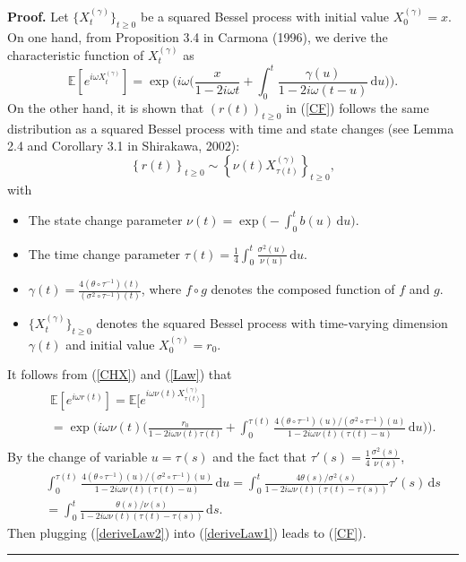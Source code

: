 \documentclass[6pt]{article}
\def\ud{\, \mathrm{d}}
\newenvironment{proof}[1][Proof]{\noindent\textbf{#1.} }{\ \rule{0.5em}{0.5em}}
\numberwithin{equation}{section}
\begin{document}
\begin{proof}
 Let $\{X^{(\gamma)}_t\}_{t\ge0}$ be a squared Bessel process with initial value $X^{(\gamma)}_0=x$. On one hand, from Proposition 3.4 in Carmona (1996), we derive the characteristic function of $X^{(\gamma)}_t$ as
\begin{equation}
\label{CHX}
\mathbb E[e^{i\omega X_t^{(\gamma)}}]=\exp\bigg(i\omega\Big(\frac{ x}{1-2i\omega t}+\int_0^t\frac{\gamma(u)}{1-2i\omega(t-u)}\ud u\Big)\bigg).
\end{equation}
On the other hand, it is shown that $(r(t))_{t\ge0}$ in (\ref{CF}) follows the same distribution as a squared Bessel process with time and state changes (see Lemma 2.4 and Corollary 3.1 in Shirakawa, 2002):
\begin{equation}
\label{Law}
\left\{r(t)\right\}_{t\ge0}\sim\left\{\nu(t)X_{\tau(t)}^{(\gamma)}\right\}_{t\ge0},
\end{equation}
with
\begin{itemize}
   \item The state change parameter $\nu(t)=\exp\big(-\int_0^tb(u)\ud u\big)$.
  \item The time change parameter $\tau(t)=\frac{1}{4}\int_0^t\frac{\sigma^2(u)}{\nu(u)}\ud u$.
  \item $\gamma(t)=\frac{4(\theta\circ \tau^{-1})(t)}{(\sigma^2\circ \tau^{-1})(t)}$, where $f\circ g$ denotes the composed function of $f$ and $g$.
       \item $\{X_t^{(\gamma)}\}_{t\ge0}$ denotes the squared Bessel process with time-varying dimension $\gamma(t)$ and initial value $X_0^{(\gamma)}=r_0$.
\end{itemize}
It follows from (\ref{CHX}) and (\ref{Law}) that
\begin{eqnarray}
\label{deriveLaw1}
&&\mathbb E[e^{i\omega r(t)}]=\mathbb E\big[e^{i\omega \nu(t)X_{\tau(t)}^{(\gamma)}}\big]\nonumber\\
&&=\exp\bigg(i\omega\nu(t)\Big(\frac{ r_0}{1-2i\omega\nu(t) \tau(t)}+\int_0^{\tau(t)}\frac{4(\theta\circ \tau^{-1})(u)/(\sigma^2\circ \tau^{-1})(u)}{1-2i\omega\nu(t)(\tau(t)-u)}\ud u\Big)\bigg).\nonumber\\
\end{eqnarray}
By the change of variable $u=\tau(s)$ and the fact that $\tau'(s)=\frac{1}{4}\frac{\sigma^2(s)}{\nu(s)}$,
\begin{eqnarray}
\label{deriveLaw2}
&&\int_0^{\tau(t)}\frac{4(\theta\circ \tau^{-1})(u)/(\sigma^2\circ \tau^{-1})(u)}{1-2i\omega\nu(t)(\tau(t)-u)}\ud u
=
\int_0^{t}\frac{4\theta(s)/\sigma^2(s)}{1-2i\omega\nu(t)(\tau(t)-\tau(s))}\tau'(s)\ud s\nonumber\\
&&=\int_0^{t}\frac{\theta(s)/\nu(s)}{1-2i\omega\nu(t)(\tau(t)-\tau(s))}\ud s.
\end{eqnarray}
Then plugging  (\ref{deriveLaw2}) into (\ref{deriveLaw1}) leads to (\ref{CF}).
\end{proof}
\end{document}
